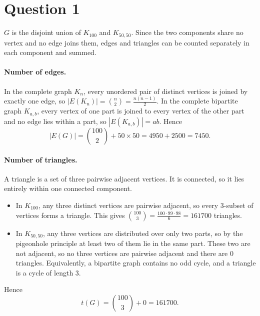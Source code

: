\documentclass[a4paper]{article}
\begin{document}



\section{Question 1}

$G$ is the disjoint union of $K_{100}$ and $K_{50,50}$. Since the two components share no vertex and no edge joins them, edges and triangles can be counted separately in each component and summed.

\paragraph{Number of edges.}
In the complete graph $K_n$, every unordered pair of distinct vertices is joined by exactly one edge, so $|E(K_n)| = \binom{n}{2} = \frac{n(n-1)}{2}$. In the complete bipartite graph $K_{a,b}$, every vertex of one part is joined to every vertex of the other part and no edge lies within a part, so $|E(K_{a,b})| = ab$. Hence
\begin{equation}
    |E(G)| = \binom{100}{2} + 50 \times 50 = 4950 + 2500 = 7450.
\end{equation}

\paragraph{Number of triangles.}
A triangle is a set of three pairwise adjacent vertices. It is connected, so it lies entirely within one connected component.
\begin{itemize}
    \item In $K_{100}$, any three distinct vertices are pairwise adjacent, so every 3-subset of vertices forms a triangle. This gives $\binom{100}{3} = \frac{100 \cdot 99 \cdot 98}{6} = 161700$ triangles.
    \item In $K_{50,50}$, any three vertices are distributed over only two parts, so by the pigeonhole principle at least two of them lie in the same part. These two are not adjacent, so no three vertices are pairwise adjacent and there are $0$ triangles. Equivalently, a bipartite graph contains no odd cycle, and a triangle is a cycle of length 3.
\end{itemize}
Hence
\begin{equation}
    t(G) = \binom{100}{3} + 0 = 161700.
\end{equation}
\end{document}

